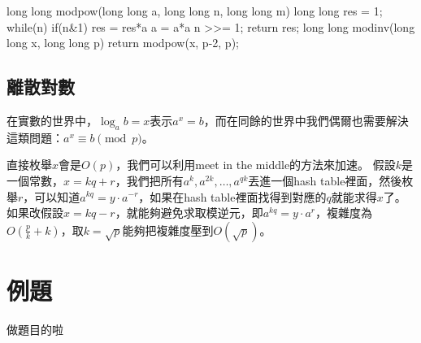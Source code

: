 \begin{C++}
long long modpow(long long a, long long n, long long m) {
	long long res = 1;
	while(n) {
		if(n&1) res = res*a%
		a = a*a%
		n >>= 1;
	}
	return res;
}
long long modinv(long long x, long long p) {
	return modpow(x, p-2, p);
}
\end{C++}

\subsection{離散對數}
在實數的世界中，$\log_a b = x$表示$a^x = b$，而在同餘的世界中我們偶爾也需要解決這類問題：$a^x \equiv b \pmod p$。

直接枚舉$x$會是$O(p)$，我們可以利用meet in the middle的方法來加速。
假設$k$是一個常數，$x = kq+r$，我們把所有$a^k, a^{2k}, \dots, a^{qk}$丟進一個hash table裡面，然後枚舉$r$，可以知道$a^{kq} = y \cdot a^{-r}$，如果在hash table裡面找得到對應的$q$就能求得$x$了。如果改假設$x=kq-r$，就能夠避免求取模逆元，即$a^{kq} = y \cdot a^r$，複雜度為$O(\frac{p}{k} + k)$，取$k = \sqrt{p}$能夠把複雜度壓到$O(\sqrt{p})$。

\section{例題}
做題目的啦

